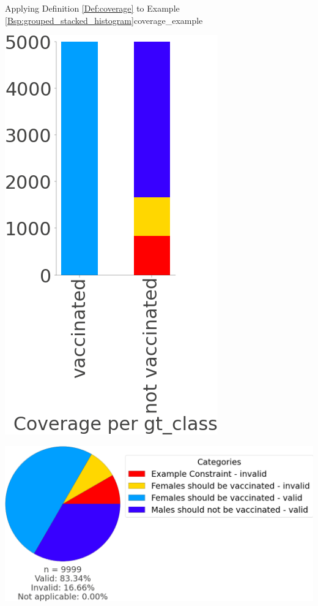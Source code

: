 \begin{Bsp}{Applying Definition \ref{Def:coverage} to Example \ref{Bsp:grouped_stacked_histogram}}{coverage_example}
   \captionsetup{type=htypei}
   \begin{minipage}[t]{\linewidth}
    \vspace{1ex}
    \centering
        \begin{minipage}[t]{0.25\linewidth}
            \includegraphics[scale=.25]{images/visualizations/coverage_constraints_gt_class.png}
        \end{minipage}
        \hspace{1ex}
        \begin{minipage}[t]{0.7\linewidth}
            \includegraphics[scale=.25]{images/visualizations/coverage_constraints_pie.png}

\end{minipage}
\end{minipage}
\end{Bsp}
